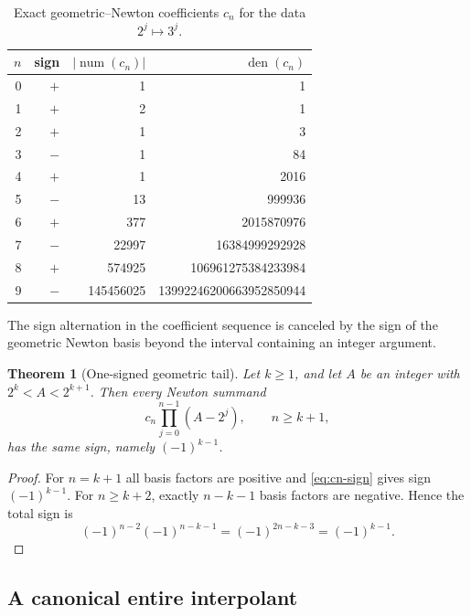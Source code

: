 \documentclass[11pt]{article}
\newtheorem{theorem}{Theorem}[section]
\theoremstyle{definition}
\begin{document}
\begin{table}[htbp]\centering
\caption{Exact geometric--Newton coefficients $c_n$ for the data $2^j\mapsto3^j$.}
\label{tab:qnewton-coeff}
\begin{tabular}{r r r r}
\toprule
$n$ & sign & $|\operatorname{num}(c_n)|$ & $\operatorname{den}(c_n)$\\
\midrule
0 & $+$ & 1 & 1\\
1 & $+$ & 2 & 1\\
2 & $+$ & 1 & 3\\
3 & $-$ & 1 & 84\\
4 & $+$ & 1 & 2016\\
5 & $-$ & 13 & 999936\\
6 & $+$ & 377 & 2015870976\\
7 & $-$ & 22997 & 16384999292928\\
8 & $+$ & 574925 & 106961275384233984\\
9 & $-$ & 145456025 & 13992246200663952850944\\
\bottomrule
\end{tabular}
\end{table}


The sign alternation in the coefficient sequence is canceled by the sign of the geometric Newton basis beyond the interval containing an integer argument.

\begin{theorem}[One-signed geometric tail]\label{thm:one-signed-tail}
Let $k\ge1$, and let $A$ be an integer with $2^k<A<2^{k+1}$.  Then every Newton summand
\[
 c_n\prod_{j=0}^{n-1}(A-2^j),\qquad n\ge k+1,
\]
has the same sign, namely $(-1)^{k-1}$.
\end{theorem}
\begin{proof}
For $n=k+1$ all basis factors are positive and \eqref{eq:cn-sign} gives sign $(-1)^{k-1}$.  For $n\ge k+2$, exactly $n-k-1$ basis factors are negative.  Hence the total sign is
\[
 (-1)^{n-2}(-1)^{n-k-1}=(-1)^{2n-k-3}=(-1)^{k-1}.
\]
\end{proof}

\subsection{A canonical entire interpolant}
\end{document}
